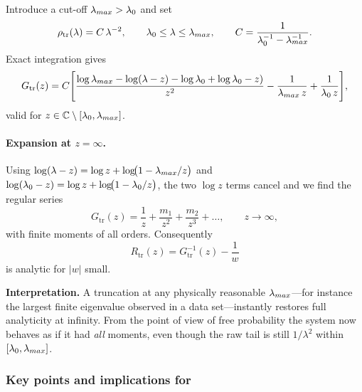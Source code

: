 Introduce a cut-off $\lambda_{max}>\lambda_{0}$ and set
\begin{equation}
\label{eqn:RTransformExists_density_trunc2}
\rho_{\mathrm{tr}}(\lambda)=
C\,\lambda^{-2},
\qquad
\lambda_{0}\le\lambda\le\lambda_{max},
\qquad
C=\frac{1}{\lambda_{0}^{-1}-\lambda_{max}^{-1}} .
\end{equation}
Exact integration gives
\begin{equation}
\label{eqn:RTransformExists_Gtrunc_exact}
G_{\mathrm{tr}}(z)=
C\Biggl[
\frac{\log\lambda_{max}-\log(\lambda-z)
      -\log\lambda_{0}+\log\lambda_{0}-z)}{z^{2}}
-\frac{1}{\lambda_{max}\,z}+\frac{1}{\lambda_{0}\,z}
\Biggr],
\end{equation}
valid for $z\in\mathbb C\setminus[\lambda_{0},\lambda_{max}]$.

\paragraph{Expansion at $z=\infty$.}
Using
$\log(\lambda-z)=\log z+\log\!\bigl(1-\lambda_{max}/z\bigr)$ and
$\log(\lambda_{0}-z)=\log z+\log\!\bigl(1-\lambda_{0}/z\bigr)$,
the two $\log z$ terms cancel and we find the regular series
\begin{equation}
\label{eqn:RTransformExists_Gtrunc_Laurent}
G_{\mathrm{tr}}(z)=
\frac{1}{z}+\frac{m_{1}}{z^{2}}+\frac{m_{2}}{z^{3}}+\dots,
\qquad
z\to\infty,
\end{equation}
with finite moments of all orders.  Consequently
\begin{equation}
\label{eqn:RTransformExists_Rtrunc2}
R_{\mathrm{tr}}(z)=G_{\mathrm{tr}}^{-1}(z)-\frac{1}{w}
\end{equation}
is analytic for $|w|$ small.

\textbf{Interpretation.}  
A truncation at any physically reasonable $\lambda_{max}$—for instance the
largest finite eigenvalue observed in a data set—instantly restores full
analyticity at infinity.  
From the point of view of free probability the system now behaves as if it
had \emph{all} moments, even though the raw tail is still $1/\lambda^{2}$
within $[\lambda_{0},\lambda_{max}]$.

\subsubsection{Key points and implications for \SETOL}
\label{sxn:RTransformExists:summary}

